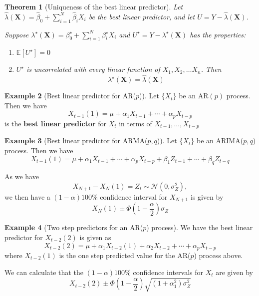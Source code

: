 \documentclass[10pt, oneside, reqno]{amsart}
\theoremstyle{plain}%
\newtheorem{thm}{Theorem}[section]
\theoremstyle{definition}
\newtheorem{exmp}[thm]{Example}
\theoremstyle{remark}
\newcommand{\expc}[1]{\mathbb{E}\left[#1\right]}
\newcommand{\ts}[1]{\{ #1 \}}
\begin{document}
\begin{thm}[Uniqueness of the best linear predictor]
    Let $\hat \lambda(\mathbf{X}) = \hat \beta_0 + \sum_{i=1}^N \hat \beta_i X_i $ be the best linear predictor, and let $U  = Y - \hat \lambda(\mathbf{X})$.  
    
    Suppose $\lambda^\star(\mathbf{X}) = \beta_0^\star + \sum_{i=1}^N \beta_i^\star X_i$ and $U^\star = Y - \lambda^\star (\mathbf{X})$ has the properties:
    \begin{enumerate}
        \item $\expc{U^\star} = 0$
        \item $U^\star$ is uncorrelated with every linear function of $X_1, X_2, \dots X_n$.  Then
        \[
            \lambda^\star(\mathbf{X}) = \hat \lambda(\mathbf{X})
        \]
    \end{enumerate}
\end{thm}
    
    
\begin{exmp}[Best linear predictor for AR($p$)]
    Let $\ts{X_t}$ be an AR$(p)$ process.  Then we have \[
     X_{t-1}(1) = \mu + \alpha_1 X_{t-1} + \cdots + \alpha_p X_{t-p}
    \]
    is the \textbf{best linear predictor} for $X_t$ in terms of $X_{t-1}, \dots, X_{t-p}$
\end{exmp}  

\begin{exmp}[Best linear predictor for ARMA($p,q$)]
    Let $\ts{X_t}$ be an ARIMA($p,q$) process.  Then we have \[
        X_{t-1}(1) = \mu + \alpha_1 X_{t-1} + \cdots + \alpha_p X_{t-p} + \beta_1 Z_{t-1} + \cdots + \beta_q Z_{t-q}
    \]
    
    As we have \[
        X_{N+1} - X_N(1) = Z_t \sim \mathcal{N}(0,\sigma_Z^2),
    \]
    we then have a $(1- \alpha)100 \%$ confidence interval for $X_{N+1}$ is given by \[
        X_N(1) \pm \Phi\left(1 - \frac{\alpha}{2}\right) \sigma_Z
    \]
\end{exmp}

\begin{exmp}[Two step predictors for an AR($p$) process]
    We have the best linear predictor for $X_{t-2}(2)$ is given as \[
        X_{t-2}(2) = \mu +  \alpha_1 X_{t-2}(1) + \alpha_2 X_{t-2} + \cdots + \alpha_p X_{t-p}
    \]
    where $X_{t-2}(1)$ is the one step predicted value for the AR($p$) process above.
    
We can calculate that the $(1- \alpha)100\%$ confidence intervals for $X_{t}$ are given by \[
    X_{t-2}(2) \pm \Phi\left(1 - \frac{\alpha}{2}\right) \sqrt{(1 + \alpha_1^2) \sigma_Z^2}
\]
\end{exmp}
\end{document}
